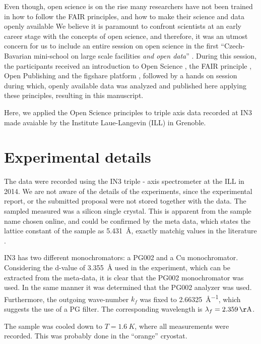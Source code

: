 \documentclass[aps,prx,reprint,amsmath,amssymb,superscriptaddress,showpacs]{revtex4-1}
\begin{document}
Even though, open science is on the rise many researchers have not been trained in how to follow the FAIR principles, and how to make their science and data openly available
We believe it is paramount to confront scientists at an early career stage with the concepts of open science, and therefore, it was an utmost concern for us to include an entire session on open science in the first ``Czech-Bavarian mini-school on large scale facilities \emph{and open data}'' \cite{mini-school}.
During this session, the participants received an introduction to Open Science \cite{foster}, the FAIR principle \cite{FAIR}, Open Publishing \cite{arXiv} and the figshare platform \cite{figshare}, followed by a hands on session during which, openly available data was analyzed and published here applying these principles, resulting in this manuscript.
 
Here, we applied the Open Science principles to triple axis data recorded at IN3 \cite{data} made avaiable by the Institute Laue-Langevin (ILL) in Grenoble.

\section{Experimental details}

The data were recorded using the IN3 triple - axis spectrometer \cite{IN3} at the ILL in 2014.
We are not aware of the details of the experiments, since the experimental report, or the submitted proposal were not stored together with the data.
The sampled measured was a silicon single crystal. 
This is apparent from the sample name chosen online, and could be confirmed by the meta data, which states the lattice constant of the sample as \SI{5.431}{\AA}, exactly matchig values in the literature \cite{siliconparams}.

IN3 has two different monochromators: a PG002 and a Cu monochromator.
Considering the d-value of \SI{3.355}{\AA} used in the experiment, which can be extracted from the meta-data, it is clear that the PG002 monochromator was used.
In the same manner it was determined that the PG002 analyzer was used. 
Furthermore, the outgoing wave-number $k_f$ was fixed to \SI{2.66325}{\AA^{-1}}, which suggests the use of a PG filter. 
The corresponding wavelength is $\lambda_f=\SI{2.359}{\AA}$.

The sample was cooled down to $T = \SI{1.6}{K}$, where all measurements were recorded. 
This was probably done in the ``orange'' cryostat.
\end{document}
